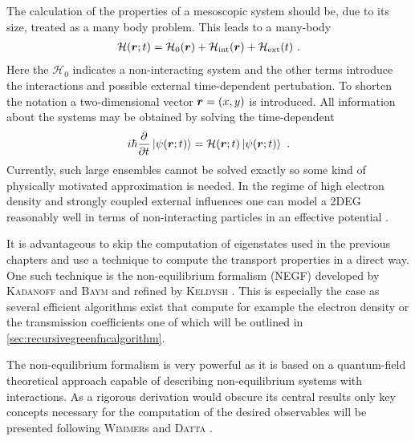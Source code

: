 The calculation of the properties of a mesoscopic system should be, due to its size, treated as a many body problem. This leads to a many-body \hamil{}
\begin{align}
\mathcal{H}(\boldsymbol{r};t) = \mathcal{H}_0(\boldsymbol{r}) + \mathcal{H}_{\text{int}}(\boldsymbol{r})+\mathcal{H}_{\text{ext}}(t)\ .
\end{align}
Here the $\mathcal{H}_0$ indicates a non-interacting system and the other terms introduce the interactions and possible external time-dependent pertubation. To shorten the notation a two-dimensional vector $\boldsymbol{r}=(x,y)$ is introduced.  
All information about the systems may be obtained by solving the time-dependent \sdg{}
\begin{align}
i\hbar \frac{\partial }{\partial t} \left| \psi(\boldsymbol{r};t) \right> = \mathcal{H}(\boldsymbol{r};t) \left| \psi(\boldsymbol{r};t) \right>\ .
\label{eqn:timedependendsdg}
\end{align}
Currently, such large ensembles cannot be solved exactly so some kind of physically motivated approximation is needed. In the regime of high electron density and strongly coupled external influences one can model a 2DEG reasonably well in terms of non-interacting particles in an effective potential \cite{fetter2003quantum}. \par
It is advantageous to skip the computation of eigenstates used in the previous chapters and use a technique to compute the transport properties in a direct way. One such technique is the non-equilibrium \gfnc{} formalism (NEGF) developed by \textsc{Kadanoff} and \textsc{Baym} \cite{kadanoff1962quantum} and refined by \textsc{Keldysh} \cite{keldysh1965}. This is especially the case as several efficient algorithms exist that compute for example the electron density or the transmission coefficients one of which will be outlined in \cref{sec:recursivegreenfncalgorithm}.\par
The non-equilibrium \gfnc{} formalism is very powerful as it is based on a quantum-field theoretical approach capable of describing non-equilibrium systems with interactions. As a rigorous derivation would obscure its central results only key concepts necessary for the computation of the desired observables will be presented following \textsc{Wimmer}s \cite{Wimmer2009Thesis} and \textsc{Datta} \cite{Datta1997}.\par
